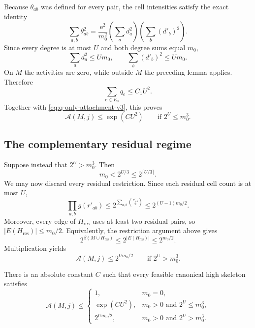Because $\theta_{ab}$ was defined for every pair, the cell intensities satisfy
the exact identity
\[
  \sum_{a,b}\theta_{ab}^2
  =
  \frac{\mathrm e^2}{m_0^2}
  \left(\sum_a d_a^2\right)
  \left(\sum_b(d'_b)^2\right).
\]
Since every degree is at most $U$ and both degree sums equal $m_0$,
\[
  \sum_a d_a^2\le Um_0,
  \qquad
  \sum_b(d'_b)^2\le Um_0.
\]
On $M$ the activities are zero, while outside $M$ the preceding lemma applies.
Therefore
\begin{equation}
  \sum_{e\in E_0}q_e\le C_1U^2.
  \label{eq:total-q-v3}
\end{equation}
Together with \eqref{eq:q-only-attachment-v3}, this proves
\begin{equation}
  \mathcal A(M,j)\le\exp(CU^2)
  \qquad\text{if }2^U\le m_0^3.
  \label{eq:intrinsic-attachment-v3}
\end{equation}

\subsection{The complementary residual regime}

Suppose instead that $2^U>m_0^3$. Then
\begin{equation}
  m_0<2^{U/3}\le2^{\lceil U/3\rceil}.
  \label{eq:small-residual-mass-v3}
\end{equation}
We may now discard every residual restriction. Since each residual cell count
is at most $U$,
\[
  \prod_{a,b}g(r'_{ab})
  \le
  2^{\sum_{a,b}\binom{r'_{ab}}2}
  \le
  2^{(U-1)m_0/2}.
\]
Moreover, every edge of $H_{\mathrm{res}}$ uses at least two residual pairs,
so $|E(H_{\mathrm{res}})|\le m_0/2$. Equivalently, the restriction argument
above gives
\[
  2^{\beta(M\cup H_{\mathrm{res}})}
  \le
  2^{|E(H_{\mathrm{res}})|}
  \le
  2^{m_0/2}.
\]
Multiplication yields
\begin{equation}
  \mathcal A(M,j)
  \le
  2^{Um_0/2}
  \qquad\text{if }2^U>m_0^3.
  \label{eq:complementary-attachment-v3}
\end{equation}

\begin{proposition}
\label{prop:uniform-residual-attachment-v3}
There is an absolute constant $C$ such that every feasible canonical high
skeleton satisfies
\[
  \mathcal A(M,j)
  \le
  \begin{cases}
    1,&m_0=0,\\
    \exp(CU^2),&m_0>0\text{ and }2^U\le m_0^3,\\
    2^{Um_0/2},&m_0>0\text{ and }2^U>m_0^3.
  \end{cases}
\]
\end{proposition}

